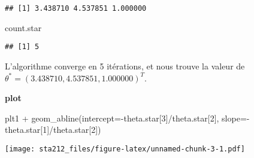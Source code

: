 \documentclass[
]{article}
\newenvironment{Shaded}{\begin{snugshade}}{\end{snugshade}}
\newcommand{\AttributeTok}[1]{\textcolor[rgb]{0.77,0.63,0.00}{#1}}
\newcommand{\DecValTok}[1]{\textcolor[rgb]{0.00,0.00,0.81}{#1}}
\newcommand{\FunctionTok}[1]{\textcolor[rgb]{0.00,0.00,0.00}{#1}}
\newcommand{\NormalTok}[1]{#1}
\newcommand{\SpecialCharTok}[1]{\textcolor[rgb]{0.00,0.00,0.00}{#1}}
\begin{document}
\begin{verbatim}
## [1] 3.438710 4.537851 1.000000
\end{verbatim}

\begin{Shaded}
\begin{Highlighting}[]
\NormalTok{count.star}
\end{Highlighting}
\end{Shaded}

\begin{verbatim}
## [1] 5
\end{verbatim}

L'algorithme converge en 5 itérations, et nous trouve la valeur de
\(\theta^* = (3.438710, 4.537851, 1.000000)^T\).

\textbf{plot}

\begin{Shaded}
\begin{Highlighting}[]
\NormalTok{plt1 }\SpecialCharTok{+} \FunctionTok{geom\_abline}\NormalTok{(}\AttributeTok{intercept=}\SpecialCharTok{{-}}\NormalTok{theta.star[}\DecValTok{3}\NormalTok{]}\SpecialCharTok{/}\NormalTok{theta.star[}\DecValTok{2}\NormalTok{], }\AttributeTok{slope=}\SpecialCharTok{{-}}\NormalTok{theta.star[}\DecValTok{1}\NormalTok{]}\SpecialCharTok{/}\NormalTok{theta.star[}\DecValTok{2}\NormalTok{])}
\end{Highlighting}
\end{Shaded}

\texttt{[image: sta212\_files/figure-latex/unnamed-chunk-3-1.pdf]}
\end{document}
